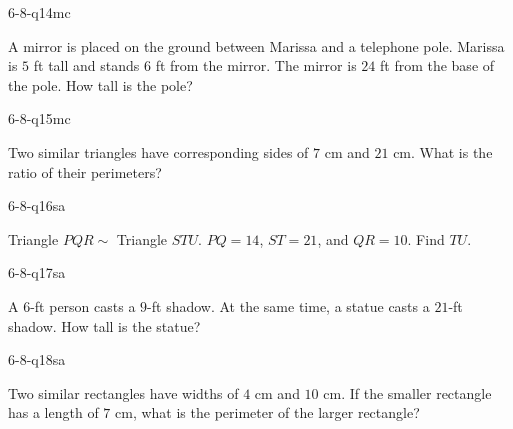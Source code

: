 \begin{practiceQuestion}{6-8-q14}{mc}
\begin{questionText}
A mirror is placed on the ground between Marissa and a telephone pole. Marissa is $5$ ft tall and stands $6$ ft from the mirror. The mirror is $24$ ft from the base of the pole. How tall is the pole?
\end{questionText}
\end{practiceQuestion}

\begin{practiceQuestion}{6-8-q15}{mc}
\begin{questionText}
Two similar triangles have corresponding sides of $7$ cm and $21$ cm. What is the ratio of their perimeters?
\end{questionText}
\end{practiceQuestion}


\begin{practiceQuestion}{6-8-q16}{sa}
\begin{questionText}
Triangle $PQR \sim$ Triangle $STU$. $PQ = 14$, $ST = 21$, and $QR = 10$. Find $TU$.
\end{questionText}
\end{practiceQuestion}

\begin{practiceQuestion}{6-8-q17}{sa}
\begin{questionText}
A $6$-ft person casts a $9$-ft shadow. At the same time, a statue casts a $21$-ft shadow. How tall is the statue?
\end{questionText}
\end{practiceQuestion}

\begin{practiceQuestion}{6-8-q18}{sa}
\begin{questionText}
Two similar rectangles have widths of $4$ cm and $10$ cm. If the smaller rectangle has a length of $7$ cm, what is the perimeter of the larger rectangle?
\end{questionText}
\end{practiceQuestion}

